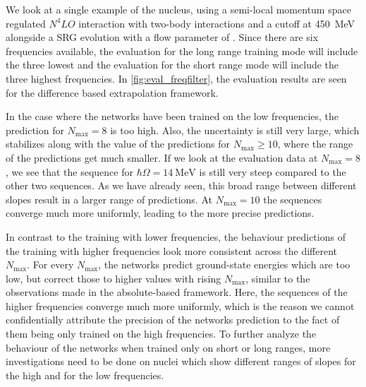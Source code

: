 We look at a single example of the  nucleus, using a semi-local momentum space regulated $N^{4}LO$ interaction with two-body interactions and a cutoff at \SI{450}{\mega\electronvolt} alongside a SRG evolution with a flow parameter of . Since there are six frequencies available, the evaluation for the long range training mode will include the three lowest and the evaluation for the short range mode will include the three highest frequencies. In \autoref{fig:eval_freqfilter}, the evaluation results are seen for the difference based extrapolation framework.

In the case where the networks have been trained on the low frequencies, the prediction for $N_\mathrm{max} = 8$ is too high. Also, the uncertainty is still very large, which stabilizes along with the value of the predictions for $N_\mathrm{max} \geq 10$, where the range of the predictions get much smaller. If we look at the evaluation data at $N_\mathrm{max} = 8$, we see that the sequence for $\hbar\Omega = \SI{14}{\mega\electronvolt}$ is still very steep compared to the other two sequences. As we have already seen, this broad range between different slopes result in a larger range of predictions. At $N_\mathrm{max} = 10$ the sequences converge much more uniformly, leading to the more precise predictions.

In contrast to the training with lower frequencies, the behaviour predictions of the training with higher frequencies look more consistent across the different $N_\mathrm{max}$. For every $N_\mathrm{max}$, the networks predict ground-state energies which are too low, but correct those to higher values with rising $N_\mathrm{max}$, similar to the observations made in the absolute-based framework. Here, the sequences of the higher frequencies converge much more uniformly, which is the reason we cannot confidentially attribute the precision of the networks prediction to the fact of them being only trained on the high frequencies. To further analyze the behaviour of the networks when trained only on short or long ranges, more investigations need to be done on nuclei which show different ranges of slopes for the high and for the low frequencies.

